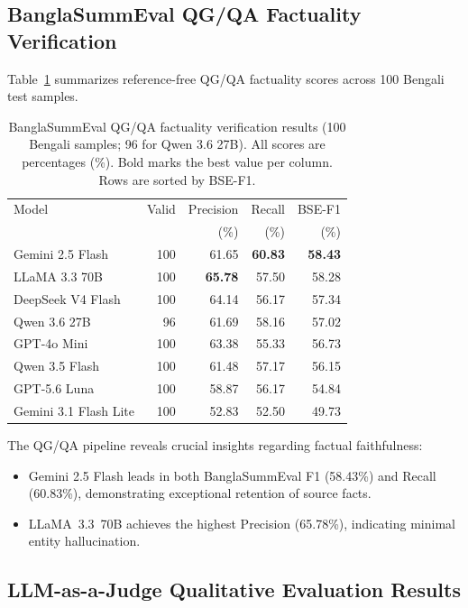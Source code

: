 \documentclass[runningheads]{llncs}
\begin{document}
\subsection{BanglaSummEval QG/QA Factuality Verification}\label{subsec:banglasummeval_results}

Table~\ref{tab:banglasummeval} summarizes reference-free QG/QA factuality scores across 100 Bengali test samples.

\begin{table}[t]
\caption{BanglaSummEval QG/QA factuality verification results (100 Bengali samples; 96 for Qwen 3.6 27B). All scores are percentages (\%). Bold marks the best value per column. Rows are sorted by BSE-F1.}\label{tab:banglasummeval}
\centering
\footnotesize
\begin{tabular}{p{3.2cm}rrrr}
\toprule
Model & Valid & Precision & Recall & BSE-F1 \\
 & & (\%) & (\%) & (\%) \\
\midrule
Gemini 2.5 Flash & 100 & 61.65 & \textbf{60.83} & \textbf{58.43} \\
LLaMA 3.3 70B & 100 & \textbf{65.78} & 57.50 & 58.28 \\
DeepSeek V4 Flash & 100 & 64.14 & 56.17 & 57.34 \\
Qwen 3.6 27B & 96 & 61.69 & 58.16 & 57.02 \\
GPT-4o Mini & 100 & 63.38 & 55.33 & 56.73 \\
Qwen 3.5 Flash & 100 & 61.48 & 57.17 & 56.15 \\
GPT-5.6 Luna & 100 & 58.87 & 56.17 & 54.84 \\
Gemini 3.1 Flash Lite & 100 & 52.83 & 52.50 & 49.73 \\
\bottomrule
\end{tabular}
\end{table}

The QG/QA pipeline reveals crucial insights regarding factual faithfulness:
\begin{itemize}
    \item Gemini 2.5 Flash leads in both BanglaSummEval F1 (58.43\%) and Recall (60.83\%), demonstrating exceptional retention of source facts.
    \item LLaMA~3.3~70B achieves the highest Precision (65.78\%), indicating minimal entity hallucination.
\end{itemize}

\subsection{LLM-as-a-Judge Qualitative Evaluation Results}\label{subsec:judge_results}
\end{document}
